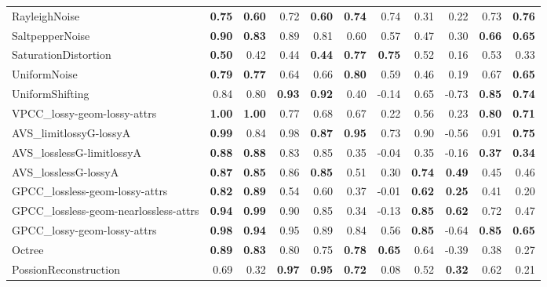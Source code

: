 \documentclass[acmsmall]{acmart}
\begin{document}
\begin{table}[htbp]
\begin{tiny}
\begin{tabular}{p{13.5em}|rr|rr|rr|rr|rr}
    \multicolumn{1}{l|}{RayleighNoise} & \textbf{0.75}  & \textbf{0.60}  & 0.72  & \textbf{0.60}  & \textbf{0.74}  & 0.74  & 0.31  & 0.22  & 0.73  & \textbf{0.76}  \\
    \multicolumn{1}{l|}{SaltpepperNoise} & \textbf{0.90}  & \textbf{0.83}  & 0.89  & 0.81  & 0.60  & 0.57  & 0.47  & 0.30  & \textbf{0.66}  & \textbf{0.65}  \\
    \multicolumn{1}{l|}{SaturationDistortion} & \textbf{0.50}  & 0.42  & 0.44  & \textbf{0.44}  & \textbf{0.77}  & \textbf{0.75}  & 0.52  & 0.16  & 0.53  & 0.33  \\
    \multicolumn{1}{l|}{UniformNoise} & \textbf{0.79}  & \textbf{0.77}  & 0.64  & 0.66  & \textbf{0.80}  & 0.59  & 0.46  & 0.19  & 0.67  & \textbf{0.65}  \\
    \multicolumn{1}{l|}{UniformShifting} & 0.84  & 0.80  & \textbf{0.93}  & \textbf{0.92}  & 0.40  & -0.14  & 0.65  & -0.73  & \textbf{0.85}  & \textbf{0.74}  \\
    \multicolumn{1}{l|}{VPCC\_lossy-geom-lossy-attrs} & \textbf{1.00}  & \textbf{1.00}  & 0.77  & 0.68  & 0.67  & 0.22  & 0.56  & 0.23  & \textbf{0.80}  & \textbf{0.71}  \\
    \multicolumn{1}{l|}{AVS\_limitlossyG-lossyA} & \textbf{0.99}  & 0.84  & 0.98  & \textbf{0.87}  & \textbf{0.95}  & 0.73  & 0.90  & -0.56  & 0.91  & \textbf{0.75}  \\
    \multicolumn{1}{l|}{AVS\_losslessG-limitlossyA} & \textbf{0.88}  & \textbf{0.88}  & 0.83  & 0.85  & 0.35  & -0.04  & 0.35  & -0.16  & \textbf{0.37}  & \textbf{0.34}  \\
    \multicolumn{1}{l|}{AVS\_losslessG-lossyA} & \textbf{0.87}  & \textbf{0.85}  & 0.86  & \textbf{0.85}  & 0.51  & 0.30  & \textbf{0.74}  & \textbf{0.49}  & 0.45  & 0.46  \\
    \multicolumn{1}{l|}{GPCC\_lossless-geom-lossy-attrs} & \textbf{0.82}  & \textbf{0.89}  & 0.54  & 0.60  & 0.37  & -0.01  & \textbf{0.62}  & \textbf{0.25}  & 0.41  & 0.20  \\
    \multicolumn{1}{l|}{GPCC\_lossless-geom-nearlossless-attrs} & \textbf{0.94}  & \textbf{0.99}  & 0.90  & 0.85  & 0.34  & -0.13  & \textbf{0.85}  & \textbf{0.62}  & 0.72  & 0.47  \\
    \multicolumn{1}{l|}{GPCC\_lossy-geom-lossy-attrs} & \textbf{0.98}  & \textbf{0.94}  & 0.95  & 0.89  & 0.84  & 0.56  & \textbf{0.85}  & -0.64  & \textbf{0.85}  & \textbf{0.65}  \\
    \multicolumn{1}{l|}{Octree} & \textbf{0.89}  & \textbf{0.83}  & 0.80  & 0.75  & \textbf{0.78}  & \textbf{0.65}  & 0.64  & -0.39  & 0.38  & 0.27  \\
    PossionReconstruction & 0.69  & 0.32  & \textbf{0.97}  & \textbf{0.95}  & \textbf{0.72}  & 0.08  & 0.52  & \textbf{0.32}  & 0.62  & 0.21  \\
    \hline
    \end{tabular}\end{tiny}
  \label{alldistortions}\end{table}
\end{document}
